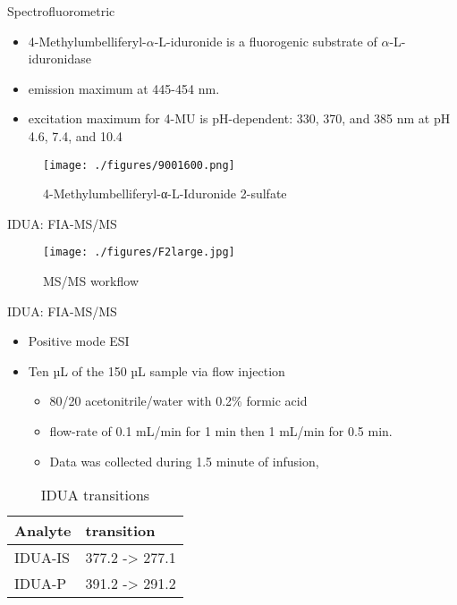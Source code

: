 \documentclass[presentation, smaller]{beamer}
\begin{document}
\begin{frame}[label={sec:orgheadline7}]{Spectrofluorometric}
\begin{itemize}
\item 4-Methylumbelliferyl-\(\alpha\)-L-iduronide is a fluorogenic substrate of \(\alpha\)-L-iduronidase
\item emission maximum at 445-454 nm.
\item excitation maximum for 4-MU is pH-dependent: 330, 370, and 385 nm at pH 4.6, 7.4, and 10.4
\end{itemize}

\begin{figure}[htb]
\centering
\texttt{[image: ./figures/9001600.png]}
\caption[4MUI]{\label{fig:4mui}
4-Methylumbelliferyl-α-L-Iduronide 2-sulfate}
\end{figure}
\end{frame}

\begin{frame}[label={sec:orgheadline8}]{IDUA: FIA-MS/MS}
\begin{figure}[htb]
\centering
\texttt{[image: ./figures/F2large.jpg]}
\caption{\label{fig:msmswf}
MS/MS workflow}
\end{figure}
\end{frame}


\begin{frame}[label={sec:orgheadline9}]{IDUA: FIA-MS/MS}
\begin{itemize}
\item Positive mode ESI
\item Ten µL of the 150 µL sample via flow injection
\begin{itemize}
\item 80/20 acetonitrile/water with 0.2\% formic acid
\item flow-rate of 0.1 mL/min for 1 min then 1 mL/min for 0.5 min.
\item Data was collected during 1.5 minute of infusion,
\end{itemize}
\end{itemize}

\begin{table}[htb]
\caption{\label{tab:mrm}
IDUA transitions}
\centering
\begin{tabular}{ll}
Analyte & transition\\
\hline
IDUA-IS & 377.2 -> 277.1\\
IDUA-P & 391.2 -> 291.2\\
\end{tabular}
\end{table}
\end{frame}
\end{document}
